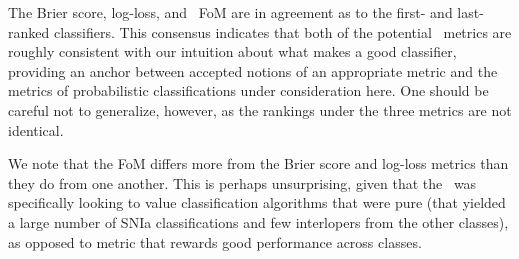The Brier score, log-loss, and \snphotcc\ FoM are in agreement as to the first- and last-ranked classifiers.
This consensus indicates that both of the potential \plasticc\ metrics are roughly consistent with our intuition about what makes a good classifier, providing an anchor between accepted notions of an appropriate metric and the metrics of probabilistic classifications under consideration here.
One should be careful not to generalize, however, as the rankings under the three metrics are not identical.

We note that the FoM differs more from the Brier score and log-loss metrics than they do from one another.
This is perhaps unsurprising, given that the \snphotcc\ was specifically looking to value classification algorithms that were pure (that yielded a large number of SNIa classifications and few interlopers from the other classes), as opposed to metric that rewards good performance across classes.
